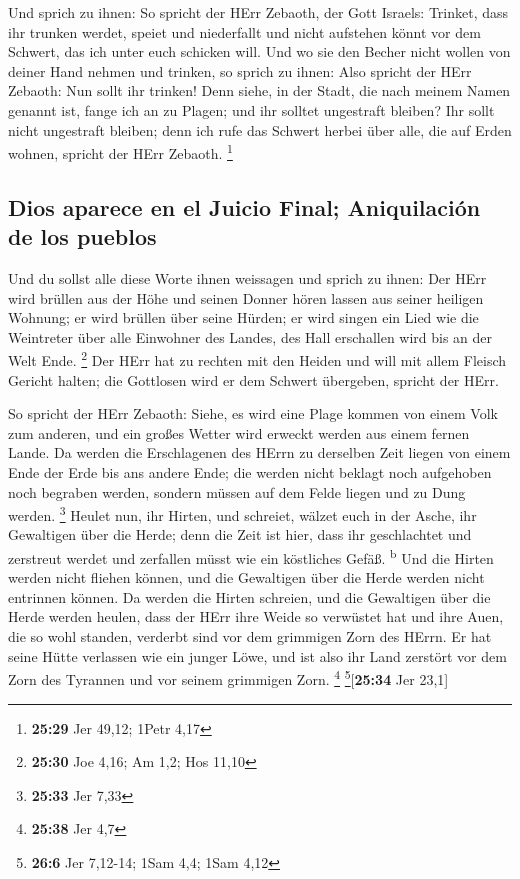  Und sprich zu ihnen: So spricht der HErr Zebaoth, der
Gott Israels: Trinket, dass ihr trunken werdet, speiet und niederfallt
und nicht aufstehen könnt vor dem Schwert, das ich unter euch schicken
will.  Und wo sie den Becher nicht wollen von deiner Hand
nehmen und trinken, so sprich zu ihnen: Also spricht der HErr Zebaoth:
Nun sollt ihr trinken!  Denn siehe, in der Stadt, die
nach meinem Namen genannt ist, fange ich an zu Plagen; und ihr solltet
ungestraft bleiben? Ihr sollt nicht ungestraft bleiben; denn ich rufe
das Schwert herbei über alle, die auf Erden wohnen, spricht der HErr
Zebaoth. \footnote{\textbf{25:29} Jer 49,12; 1Petr 4,17}

\hypertarget{dios-aparece-en-el-juicio-final-aniquilaciuxf3n-de-los-pueblos}{%
\subsection{Dios aparece en el Juicio Final; Aniquilación de los
pueblos}\label{dios-aparece-en-el-juicio-final-aniquilaciuxf3n-de-los-pueblos}}

 Und du sollst alle diese Worte ihnen weissagen und
sprich zu ihnen: Der HErr wird brüllen aus der Höhe und seinen Donner
hören lassen aus seiner heiligen Wohnung; er wird brüllen über seine
Hürden; er wird singen ein Lied wie die Weintreter über alle Einwohner
des Landes, des Hall erschallen wird bis an der Welt Ende. \footnote{\textbf{25:30}
  Joe 4,16; Am 1,2; Hos 11,10}  Der HErr hat zu rechten
mit den Heiden und will mit allem Fleisch Gericht halten; die Gottlosen
wird er dem Schwert übergeben, spricht der HErr.

 So spricht der HErr Zebaoth: Siehe, es wird eine Plage
kommen von einem Volk zum anderen, und ein großes Wetter wird erweckt
werden aus einem fernen Lande.  Da werden die
Erschlagenen des HErrn zu derselben Zeit liegen von einem Ende der Erde
bis ans andere Ende; die werden nicht beklagt noch aufgehoben noch
begraben werden, sondern müssen auf dem Felde liegen und zu Dung werden.
\footnote{\textbf{25:33} Jer 7,33}  Heulet nun, ihr
Hirten, und schreiet, wälzet euch in der Asche, ihr Gewaltigen über die
Herde; denn die Zeit ist hier, dass ihr geschlachtet und zerstreut
werdet und zerfallen müsst wie ein köstliches Gefäß. \textsuperscript{b}
 Und die Hirten werden nicht fliehen können, und die
Gewaltigen über die Herde werden nicht entrinnen können. 
Da werden die Hirten schreien, und die Gewaltigen über die Herde werden
heulen, dass der HErr ihre Weide so verwüstet hat  und
ihre Auen, die so wohl standen, verderbt sind vor dem grimmigen Zorn des
HErrn.  Er hat seine Hütte verlassen wie ein junger Löwe,
und ist also ihr Land zerstört vor dem Zorn des Tyrannen und vor seinem
grimmigen Zorn. \footnote{\textbf{25:38} Jer 4,7}
\footnote{\textbf{26:6} Jer 7,12-14; 1Sam 4,4; 1Sam 4,12}{[}\textbf{25:34}
Jer 23,1{]}

